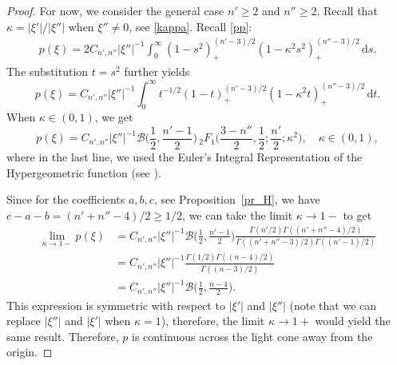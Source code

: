 \documentclass[11pt]{amsart}
\theoremstyle{definition}
\theoremstyle{remark}
\numberwithin{equation}{section}
\renewcommand{\d}{\,\mathrm{d}}
\begin{document}
\begin{proof}
For now, we consider the general case $n'\ge2$ and $n''\ge2$. 
Recall that $\kappa = |\xi'|/|\xi''|$ 
 when $\xi''\not=0$, see \eqref{kappa}. 
 Recall \eqref{pp}:
\begin{align}
	p(\xi) = 2C_{n',n''} |\xi''|^{-1} \int_0^\infty (1-s^2)_+^{(n'-3)/2} (1-\kappa^2 s^2)_+^{(n''-3)/2} \d s.%
\end{align}
The substitution $t = s^2$ further yields
\begin{equation} \label{ppp}
	p(\xi) = C_{n',n''}  |\xi''|^{-1} \int_0^\infty t^{-1/2} (1-t)_+^{(n'-3)/2} (1-\kappa^2 t)_+^{(n''-3)/2} \d t.
\end{equation}	
When $\kappa\in (0,1)$, we get
\[
p(\xi)	=  C_{n',n''}  |\xi''|^{-1} \mathcal{B} \Big( \frac{1}{2}, \frac{n'-1}{2} \Big)\, {}_2F_1\Big(\frac{3-n''}{2}, \frac{1}{2}; \frac{n'}{2}; \kappa^2\Big),\quad \kappa\in (0,1),
\]
where in the last line, we used the Euler's Integral Representation of the Hypergeometric function (see \cite[Theorem~2.2.1]{Andrews-SF}).

Since for the coefficients $a,b,c$, see Proposition~\ref{pr_H}, we have $c-a-b= (n'+n''-4)/2\ge  1/2$, we can take the limit $\kappa\to 1-$ to get
\begin{align*}
	\lim_{\kappa \to 1-} p(\xi) &= C_{n',n''}  |\xi''|^{-1} \mathcal{B}\Big(\frac{1}{2}, \frac{n'-1}{2}\Big) \frac{\Gamma(n'/2) \Gamma((n'+n''-4)/2)}{\Gamma((n'+n''-3)/2) \Gamma((n'-1)/2)}\\
	&= C_{n',n''}  |\xi''|^{-1}   \frac{ \Gamma(1/2)  \Gamma((n-4)/2)}{\Gamma((n-3)/2) }\\
	& =C_{n',n''}   |\xi''|^{-1}   \mathcal{B}\Big(\frac{1}{2}, \frac{n -4}{2}\Big) . 
\end{align*}
This expression is symmetric with respect to $|\xi'|$ and $|\xi''|$ (note that we can replace $|\xi''|$ and $|\xi'|$ when $\kappa=1$), therefore, the limit $\kappa\to 1+$ would yield the same result. Therefore, $p$ is continuous across the light cone away from the origin. 


\end{proof}
\end{document}
